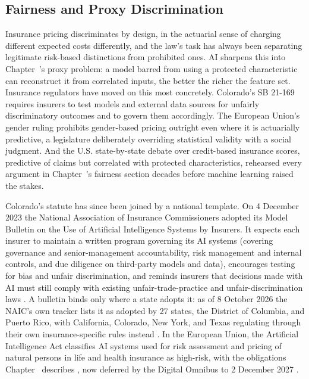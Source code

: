 \documentclass[../ai_in_finance]{subfiles}
\begin{document}
\subsection{Fairness and Proxy Discrimination}
\label{sec:ins-fairness}

Insurance pricing discriminates by design, in the actuarial sense of charging different expected costs differently, and the law's task has always been separating legitimate risk-based distinctions from prohibited ones. AI sharpens this into Chapter~'s proxy problem: a model barred from using a protected characteristic can reconstruct it from correlated inputs, the better the richer the feature set. Insurance regulators have moved on this most concretely. Colorado's SB 21-169 requires insurers to test models and external data sources for unfairly discriminatory outcomes and to govern them accordingly. The European Union's gender ruling prohibits gender-based pricing outright even where it is actuarially predictive, a legislature deliberately overriding statistical validity with a social judgment. And the U.S. state-by-state debate over credit-based insurance scores, predictive of claims but correlated with protected characteristics, rehearsed every argument in Chapter~'s fairness section decades before machine learning raised the stakes.

Colorado's statute has since been joined by a national template. On 4 December 2023 the National Association of Insurance Commissioners adopted its Model Bulletin on the Use of Artificial Intelligence Systems by Insurers. It expects each insurer to maintain a written program governing its AI systems (covering governance and senior-management accountability, risk management and internal controls, and due diligence on third-party models and data), encourages testing for bias and unfair discrimination, and reminds insurers that decisions made with AI must still comply with existing unfair-trade-practice and unfair-discrimination laws \parencite{naic2023bulletin}. A bulletin binds only where a state adopts it: as of 8 October 2026 the NAIC's own tracker lists it as adopted by 27 states, the District of Columbia, and Puerto Rico, with California, Colorado, New York, and Texas regulating through their own insurance-specific rules instead \parencite{naic2026adoption}. In the European Union, the Artificial Intelligence Act classifies AI systems used for risk assessment and pricing of natural persons in life and health insurance as high-risk, with the obligations Chapter~ describes \parencite{eu2024aiact}, now deferred by the Digital Omnibus to 2 December 2027 \parencite{eu2026omnibus}.
\end{document}
